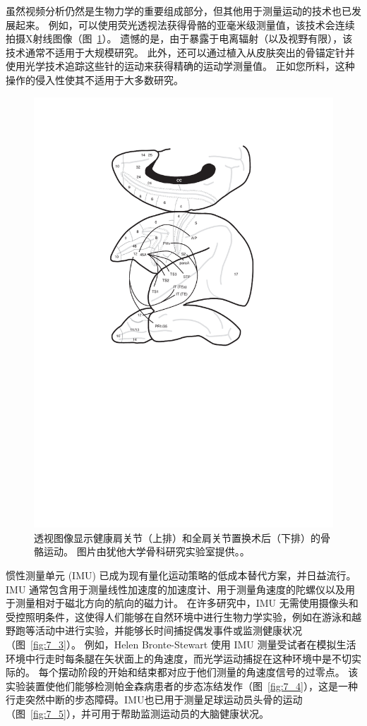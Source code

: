 虽然视频分析仍然是生物力学的重要组成部分，但其他用于测量运动的技术也已发展起来。
例如，可以使用荧光透视法获得骨骼的亚毫米级测量值，该技术会连续拍摄X射线图像（图~\ref{fig:7_2}）。
遗憾的是，由于暴露于电离辐射（以及视野有限），该技术通常不适用于大规模研究。
此外，还可以通过植入从皮肤突出的骨锚定针并使用光学技术追踪这些针的运动来获得精确的运动学测量值。
正如您所料，这种操作的侵入性使其不适用于大多数研究。


\begin{figure}[!htb]
	\centering
	\includegraphics[width=1.0\linewidth]{chap7/7_2}
	\caption{透视图像显示健康肩关节（上排）和全肩关节置换术后（下排）的骨骼运动。
		图片由犹他大学骨科研究实验室提供。。 \label{fig:7_2}}
\end{figure}


惯性测量单元 (IMU) 已成为现有量化运动策略的低成本替代方案，并日益流行。
IMU 通常包含用于测量线性加速度的加速度计、用于测量角速度的陀螺仪以及用于测量相对于磁北方向的航向的磁力计。
在许多研究中，IMU 无需使用摄像头和受控照明条件，这使得人们能够在自然环境中进行生物力学实验，例如在游泳和越野跑等活动中进行实验，并能够长时间捕捉偶发事件或监测健康状况（图~\ref{fig:7_3}）。
例如，Helen Bronte-Stewart 使用 IMU 测量受试者在模拟生活环境中行走时每条腿在矢状面上的角速度，而光学运动捕捉在这种环境中是不切实际的。
每个摆动阶段的开始和结束都对应于他们测量的角速度信号的过零点。
该实验装置使他们能够检测帕金森病患者的步态冻结发作（图~\ref{fig:7_4}），这是一种行走突然中断的步态障碍。IMU也已用于测量足球运动员头骨的运动（图~\ref{fig:7_5}），并可用于帮助监测运动员的大脑健康状况。


